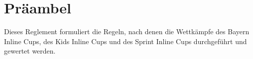\section{Präambel}
Dieses Reglement formuliert die Regeln, nach denen die Wettkämpfe des Bayern Inline Cups, des Kids Inline Cups und des Sprint Inline Cups durchgeführt und gewertet werden.